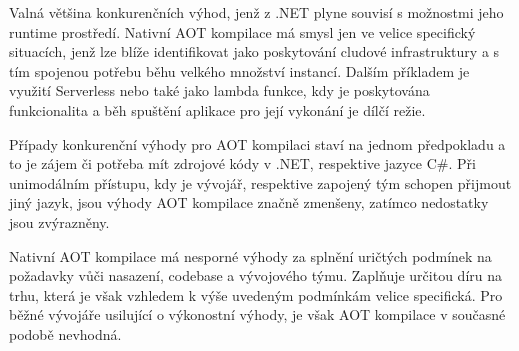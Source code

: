 Valná většina konkurenčních výhod, jenž z .NET plyne souvisí s možnostmi jeho runtime prostředí. Nativní AOT kompilace má smysl jen ve velice specifický situacích, jenž lze blíže identifikovat jako poskytování cludové infrastruktury a s tím spojenou potřebu běhu velkého množství instancí. Dalším příkladem je využití Serverless nebo také jako lambda funkce, kdy je poskytována funkcionalita a běh spuštění aplikace pro její vykonání je dílčí režie.

Případy konkurenční výhody pro AOT kompilaci staví na jednom předpokladu a to je zájem či potřeba mít zdrojové kódy v .NET, respektive jazyce C\#. Při unimodálním přístupu, kdy je vývojář, respektive zapojený tým schopen přijmout jiný jazyk, jsou výhody AOT kompilace značně zmenšeny, zatímco nedostatky jsou zvýrazněny.

Nativní AOT kompilace má nesporné výhody za splnění uričtých podmínek na požadavky vůči nasazení, codebase a vývojového týmu. Zaplňuje určitou díru na trhu, která je však vzhledem k výše uvedeným podmínkám velice specifická. Pro běžné vývojáře usilující o výkonostní výhody, je však AOT kompilace v současné podobě nevhodná.
